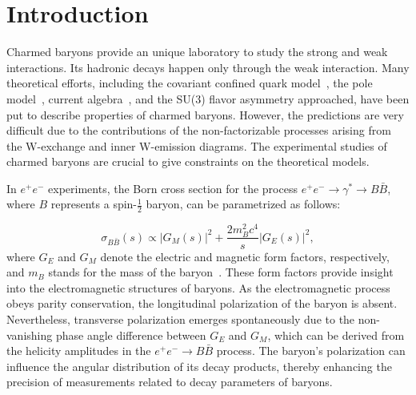 \section{Introduction}
\label{sec:intro}
Charmed baryons provide an unique laboratory to study the strong and weak interactions. Its hadronic decays happen only through the weak interaction. Many theoretical efforts, including the covariant confined quark model~\cite{Korner:1992wi,Ivanov:1997ra}, the pole model~\cite{Cheng:1991sn,Xu:1992vc,Cheng:1993gf,Xu:1992sw,Zenczykowski:1993jm,Sharma:1998rd}, current algebra~\cite{Korner:1978ec,Uppal:1994pt}, and the SU(3) flavor asymmetry approached, have been put to describe properties of charmed baryons. However, the predictions are very difficult due to the contributions of the non-factorizable processes arising from the W-exchange and inner W-emission diagrams. The experimental studies of charmed baryons are crucial to give constraints on the theoretical models.

In $e^+e^-$ experiments, the Born cross section for the process $e^+e^- \to \gamma^* \to B\bar{B}$, where $B$ represents a spin-$\frac{1}{2}$ baryon, can be parametrized as follows:

\begin{equation}
\sigma_{B\bar{B}}(s) \propto |G_M(s)|^2 + \frac{2m_B^2c^4}{s}|G_E(s)|^2,
\end{equation}
where $G_E$ and $G_M$ denote the electric and magnetic form factors, respectively, and $m_B$ stands for the mass of the baryon~\cite{BESIII:2019nep}. These form factors provide insight into the electromagnetic structures of baryons. As the electromagnetic process obeys parity conservation, the longitudinal polarization of the baryon is absent. Nevertheless, transverse polarization emerges spontaneously due to the non-vanishing phase angle difference between $G_E$ and $G_M$, which can be derived from the helicity amplitudes in the $e^+e^- \to B\bar{B}$ process. The baryon's polarization can influence the angular distribution of its decay products, thereby enhancing the precision of measurements related to decay parameters of baryons.

